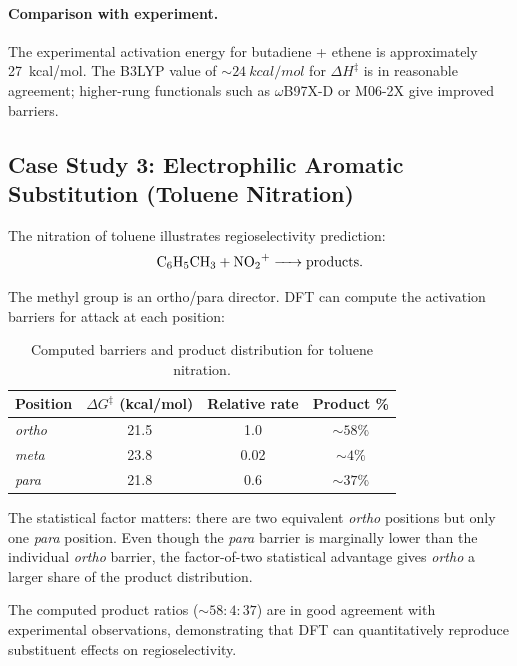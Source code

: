 \documentclass[11pt]{article}
\numberwithin{equation}{section}
\begin{document}
\paragraph{Comparison with experiment.} The experimental activation energy for butadiene + ethene is approximately \SI{27}{kcal/mol}. The B3LYP value of $\sim\!\SI{24}{kcal/mol}$ for $\Delta H^\ddagger$ is in reasonable agreement; higher-rung functionals such as $\omega$B97X-D or M06-2X give improved barriers.

\subsection{Case Study 3: Electrophilic Aromatic Substitution (Toluene Nitration)}

The nitration of toluene illustrates regioselectivity prediction:
\begin{equation}
\ce{C6H5CH3 + NO2+ -> products}.
\end{equation}

The methyl group is an ortho/para director. DFT can compute the activation barriers for  attack at each position:

\begin{table}[H]
\centering
\caption{Computed barriers and product distribution for toluene nitration.}
\label{tab:toluene}
\begin{tabular}{lccc}
\toprule
\textbf{Position} & $\Delta G^\ddagger$ (kcal/mol) & \textbf{Relative rate} & \textbf{Product \%} \\
\midrule
\textit{ortho} & 21.5 & 1.0 & ${\sim}58\%$ \\
\textit{meta} & 23.8 & 0.02 & ${\sim}4\%$ \\
\textit{para} & 21.8 & 0.6 & ${\sim}37\%$ \\
\bottomrule
\end{tabular}
\end{table}

The statistical factor matters: there are two equivalent \textit{ortho} positions but only one \textit{para} position. Even though the \textit{para} barrier is marginally lower than the individual \textit{ortho} barrier, the factor-of-two statistical advantage gives \textit{ortho} a larger share of the product distribution.

The computed product ratios (${\sim}58:4:37$) are in good agreement with experimental observations, demonstrating that DFT can quantitatively reproduce substituent effects on regioselectivity.
\end{document}
